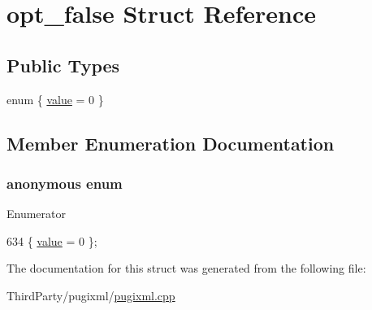 \hypertarget{structopt__false}{\section{opt\-\_\-false Struct Reference}
\label{structopt__false}
}
\subsection*{Public Types}
\begin{DoxyCompactItemize}
\item 
enum \{ \hyperlink{structopt__false_adf1eb3ad7c3e284bd861d80d6817174fa0608b30b4b0f63ec3263f29fe847899e}{value} = 0
 \}
\end{DoxyCompactItemize}


\subsection{Member Enumeration Documentation}
\hypertarget{structopt__false_adf1eb3ad7c3e284bd861d80d6817174f}{\subsubsection[{anonymous enum}]{\setlength{\rightskip}{0pt plus 5cm}anonymous enum}}\label{structopt__false_adf1eb3ad7c3e284bd861d80d6817174f}
\begin{Desc}
\item[Enumerator]\par
\begin{description}
\item[{\em 
\hypertarget{structopt__false_adf1eb3ad7c3e284bd861d80d6817174fa0608b30b4b0f63ec3263f29fe847899e}{value}\label{structopt__false_adf1eb3ad7c3e284bd861d80d6817174fa0608b30b4b0f63ec3263f29fe847899e}
}]\end{description}
\end{Desc}

\begin{DoxyCode}
634 \{ \hyperlink{structopt__false_adf1eb3ad7c3e284bd861d80d6817174fa0608b30b4b0f63ec3263f29fe847899e}{value} = 0 \};
\end{DoxyCode}


The documentation for this struct was generated from the following file\-:\begin{DoxyCompactItemize}
\item 
Third\-Party/pugixml/\hyperlink{pugixml_8cpp}{pugixml.\-cpp}\end{DoxyCompactItemize}
